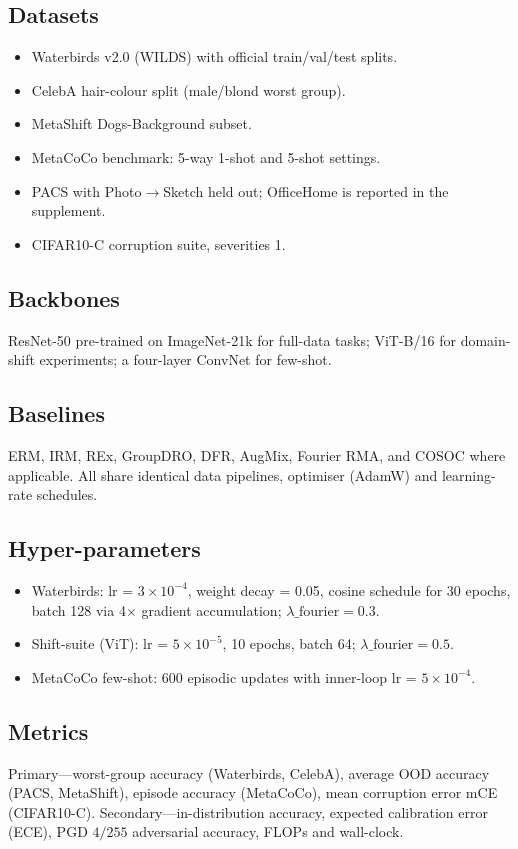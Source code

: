 \documentclass{article}
\begin{document}
\subsection{Datasets}
\begin{itemize}
  \item Waterbirds v2.0 (WILDS) with official train/val/test splits.
  \item CelebA hair-colour split (male/blond worst group).
  \item MetaShift Dogs-Background subset.
  \item MetaCoCo benchmark: 5-way 1-shot and 5-shot settings.
  \item PACS with Photo\(\to\)Sketch held out; OfficeHome is reported in the supplement.
  \item CIFAR10-C corruption suite, severities 1.
\end{itemize}

\subsection{Backbones}
ResNet-50 pre-trained on ImageNet-21k for full-data tasks; ViT-B/16 for domain-shift experiments; a four-layer ConvNet for few-shot.

\subsection{Baselines}
ERM, IRM, REx, GroupDRO, DFR, AugMix, Fourier RMA, and COSOC where applicable. All share identical data pipelines, optimiser (AdamW) and learning-rate schedules.

\subsection{Hyper-parameters}
\begin{itemize}
  \item Waterbirds: lr = \(3\times10^{-4}\), weight decay = 0.05, cosine schedule for 30 epochs, batch 128 via 4\(\times\) gradient accumulation; \(\lambda\_{\text{fourier}} = 0.3\).
  \item Shift-suite (ViT): lr = \(5\times10^{-5}\), 10 epochs, batch 64; \(\lambda\_{\text{fourier}} = 0.5\).
  \item MetaCoCo few-shot: 600 episodic updates with inner-loop lr = \(5\times10^{-4}\).
\end{itemize}

\subsection{Metrics}
Primary—worst-group accuracy (Waterbirds, CelebA), average OOD accuracy (PACS, MetaShift), episode accuracy (MetaCoCo), mean corruption error mCE (CIFAR10-C). Secondary—in-distribution accuracy, expected calibration error (ECE), PGD \(4/255\) adversarial accuracy, FLOPs and wall-clock.
\end{document}
